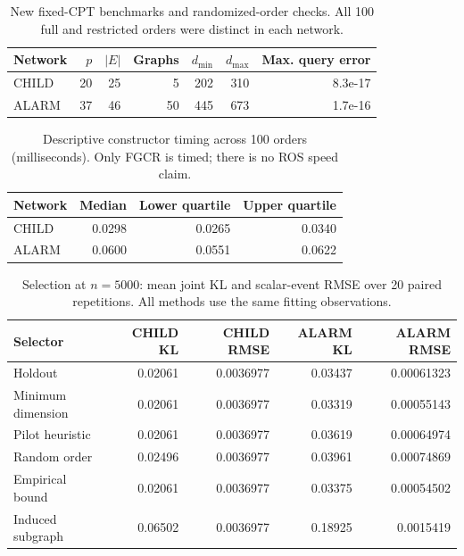 \begin{table}[tbp]\centering
\caption{New fixed-CPT benchmarks and randomized-order checks. All 100 full and restricted orders were distinct in each network.}\label{tab:new-structure}
\begin{tabular}{lrrrrrr}
\toprule
Network & $p$ & $|E|$ & Graphs & $d_{\min}$ & $d_{\max}$ & Max. query error\\
\midrule
CHILD & 20 & 25 & 5 & 202 & 310 & 8.3e-17\\
ALARM & 37 & 46 & 50 & 445 & 673 & 1.7e-16\\
\bottomrule\end{tabular}\end{table}
\begin{table}[tbp]\centering
\caption{Descriptive constructor timing across 100 orders (milliseconds). Only FGCR is timed; there is no ROS speed claim.}\label{tab:new-time}
\begin{tabular}{lrrr}
\toprule
Network & Median & Lower quartile & Upper quartile\\
\midrule
CHILD & 0.0298 & 0.0265 & 0.0340\\
ALARM & 0.0600 & 0.0551 & 0.0622\\
\bottomrule\end{tabular}\end{table}
\begin{table}[tbp]\centering
\caption{Selection at $n=5000$: mean joint KL and scalar-event RMSE over 20 paired repetitions. All methods use the same fitting observations.}\label{tab:new-selection}
\begin{tabular}{lrrrr}
\toprule
Selector & CHILD KL & CHILD RMSE & ALARM KL & ALARM RMSE\\
\midrule
Holdout & 0.02061 & 0.0036977 & 0.03437 & 0.00061323\\
Minimum dimension & 0.02061 & 0.0036977 & 0.03319 & 0.00055143\\
Pilot heuristic & 0.02061 & 0.0036977 & 0.03619 & 0.00064974\\
Random order & 0.02496 & 0.0036977 & 0.03961 & 0.00074869\\
Empirical bound & 0.02061 & 0.0036977 & 0.03375 & 0.00054502\\
Induced subgraph & 0.06502 & 0.0036977 & 0.18925 & 0.0015419\\
\bottomrule\end{tabular}\end{table}

